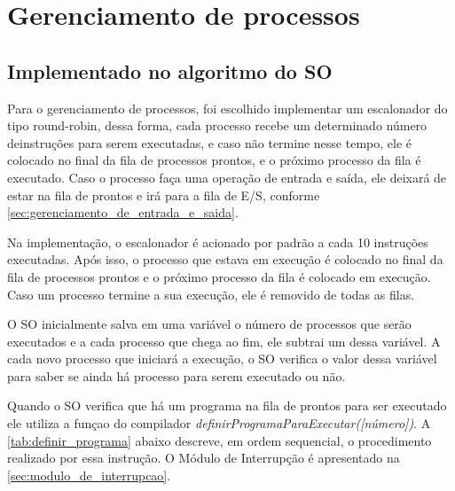 \documentclass[
	12pt,				%
	oneside,
	a4paper,			%
	english,			%
	french,				%
	spanish,			%
	brazil,				%
	]{abntex2}
\begin{document}
\section{Gerenciamento de processos}

\subsection{Implementado no algoritmo do SO}

Para o gerenciamento de processos, foi escolhido implementar um escalonador do tipo round-robin, dessa forma, cada processo recebe um determinado número deinstruções para serem executadas, e caso não termine nesse tempo, ele é colocado no final da fila de processos prontos, e o próximo processo da fila é executado. Caso o processo faça uma operação de entrada e saída, ele deixará de estar na fila de prontos e irá para a fila de E/S, conforme \autoref{sec:gerenciamento_de_entrada_e_saida}.

Na implementação, o escalonador é acionado por padrão a cada 10 instruções executadas. Após isso, o processo que estava em execução é colocado no final da fila de processos prontos e o próximo processo da fila é colocado em execução. Caso um processo termine a sua execução, ele é removido de todas as filas.

O SO inicialmente salva em uma variável o número de processos que serão executados e a cada processo que chega ao fim, ele subtrai um dessa variável. A cada novo processo que iniciará a execução, o SO verifica o valor dessa variável para saber se ainda há processo para serem executado ou não.

Quando o SO verifica que há um programa na fila de prontos para ser executado ele utiliza a funçao do compilador \textit{definirProgramaParaExecutar([número])}. A \autoref{tab:definir_programa} abaixo descreve, em ordem sequencial, o procedimento realizado por essa instrução. O Módulo de Interrupção é apresentado na \autoref{sec:modulo_de_interrupcao}.

\vspace{0.5em}
\end{document}
